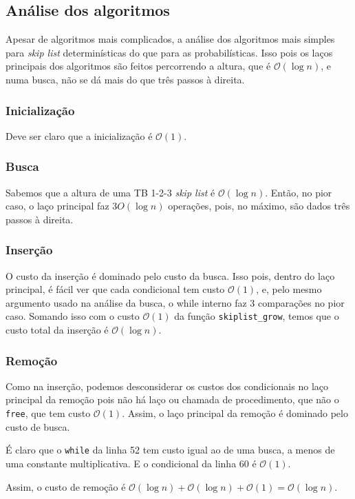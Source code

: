 \documentclass[paper=a4, fontsize=11pt]{scrartcl} %
\numberwithin{equation}{section}
\numberwithin{figure}{section}
\numberwithin{table}{section}
\numberwithin{definition}{section}
\numberwithin{theorem}{section}
\numberwithin{property}{section}
\numberwithin{proposition}{section}
\newcommand{\cO}{\ensuremath{\mathcal{O}}}
\renewcommand{\sl}{\textit{skip list}\xspace}
\begin{document}
\subsection{Análise dos algoritmos}

Apesar de algoritmos mais complicados, a análise dos algoritmos mais simples para \sl determinísticas
do que para as probabilísticas. Isso pois os laços principais dos algoritmos são feitos percorrendo
a altura, que é $\cO(\log n)$, e numa busca, não se dá mais do que três passos à direita.

\subsubsection{Inicialização}

Deve ser claro que a inicialização é $\cO(1)$.

\subsubsection{Busca}

Sabemos que a altura de uma TB 1-2-3 \sl é $\cO(\log n)$. Então, no pior caso, o laço principal faz
$3 O(\log n)$ operações, pois, no máximo, são dados três passos à direita.

\subsubsection{Inserção}

O custo da inserção é dominado pelo custo da busca. Isso pois, dentro do laço principal, é fácil
ver que cada condicional tem custo $\cO(1)$, e, pelo mesmo argumento usado na análise da busca, 
o while interno faz 3 comparações no pior caso. Somando isso com o custo $\cO(1)$ da função 
\verb|skiplist_grow|, temos que o custo total da inserção é $\cO(\log n)$.

\subsubsection{Remoção}

Como na inserção, podemos desconsiderar os custos dos condicionais no laço principal da remoção pois 
não há laço ou chamada de procedimento, que não o \verb|free|, que tem custo $\cO(1)$. Assim, o
laço principal da remoção é dominado pelo custo de busca.

É claro que o \verb|while| da linha 52 tem custo igual ao de uma busca, a menos de uma constante
multiplicativa. E o condicional da linha 60 é $\cO(1)$.

Assim, o custo de remoção é $\cO(\log n) + \cO(\log n) + \cO(1) = \cO(\log n)$.

{}
\end{document}
